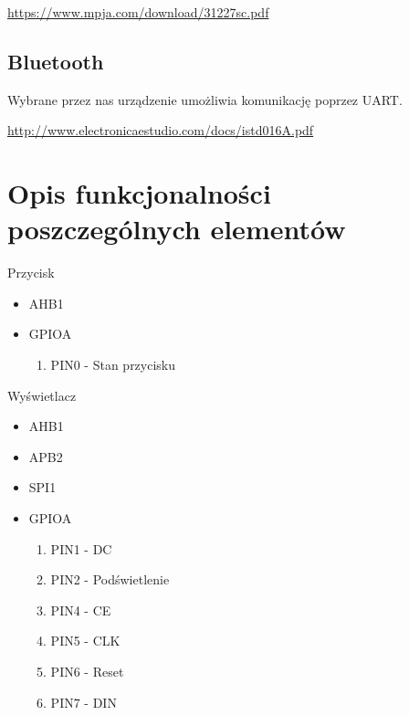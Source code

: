 \documentclass{article}
\begin{document}
\url{https://www.mpja.com/download/31227sc.pdf}
\subsection{Bluetooth}

Wybrane przez nas urządzenie umożliwia komunikację poprzez UART.

\url{http://www.electronicaestudio.com/docs/istd016A.pdf}


\section{Opis funkcjonalności poszczególnych elementów}

Przycisk
\begin{itemize}
    \item AHB1
    \item GPIOA
    \begin{enumerate}
        \item PIN0 - Stan przycisku
    \end{enumerate}
\end{itemize}

Wyświetlacz
\begin{itemize}
    \item AHB1
    \item APB2
    \item SPI1
    \item GPIOA
        \begin{enumerate}
            \item PIN1 - DC
            \item PIN2 - Podświetlenie
            \item PIN4 - CE
            \item PIN5 - CLK
            \item PIN6 - Reset
            \item PIN7 - DIN
        \end{enumerate}
\end{itemize}
\end{document}
